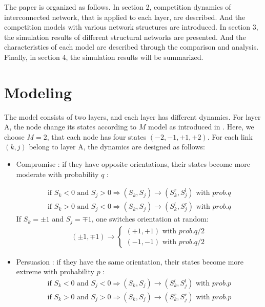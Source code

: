 \documentclass[english]{cccconf}
\begin{document}
The paper is organized as follows. In section 2, competition dynamics of interconnected network, that is applied to each layer, are described. And the competition models with various network structures are introduced.  In section 3, the simulation results of different structural networks are presented. And the characteristics of each model are described through the comparison and analysis. Finally, in section 4, the simulation results will be summarized.

\section{Modeling}
The model consists of two layers, and each layer has different dynamics. For layer A, the node change its states according to $M$ model as introduced in \cite{rocca2014}. Here, we choose $M=2$, that each node has four states $(-2, -1, +1, +2)$. For each link $(k, j)$ belong to layer A,  the dynamics are designed as follows:
\begin{itemize}
\item Compromise : if they have opposite orientations, their states become more moderate with probability $q$ :

\begin{align*}
\mbox{if } S_k<0 \mbox{ and } S_j>0  \Rightarrow (S_k, S_j) \rightarrow (S_k^r, S_j^l) \mbox{ with } prob.q\\
\mbox{if } S_k>0 \mbox{ and } S_j<0  \Rightarrow (S_k, S_j) \rightarrow (S_k^l, S_j^r) \mbox{ with } prob.q
\end{align*}
If $S_k = \pm1$ and $S_j = \mp1$, one switches orientation at random:
\begin{align*}
(\pm 1, \mp 1)\rightarrow \left\{\begin{matrix}
(+1, +1) \mbox{ with } prob.q/2
\\(-1, -1)\mbox{ with } prob.q/2
\end{matrix}\right.
\end{align*}
\item Persuasion : if they have the same orientation, their states become more extreme with probability $p$ :
\begin{align*}
\mbox{if } S_k<0 \mbox{ and } S_j<0  \Rightarrow (S_k, S_j) \rightarrow (S_k^l, S_j^l) \mbox{ with } prob.p\\
\mbox{if } S_k>0 \mbox{ and } S_j>0  \Rightarrow (S_k, S_j) \rightarrow (S_k^r, S_j^r) \mbox{ with } prob.p
\end{align*}
\end{itemize}
\end{document}
